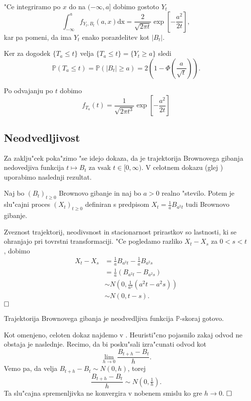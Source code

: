 \documentclass[twoside,11pt]{article}
\begin{document}
"Ce integriramo  po $x$ do na $(-\infty, a]$ dobimo gostoto $Y_t$ 
$$
    \int_{-\infty}^a f_{Y_t, B_t}(a, x)\text{dx} = \frac{2}{\sqrt{2\pi t}}\exp\left[-\frac{a^2}{2t}\right],
$$
kar pa pomeni, da ima $Y_t$ enako porazdelitev kot $|B_t|$.

Ker za dogodek  $\{T_a \leq t\}$ velja $\{T_a \leq t\} = \{Y_t \geq a\}$ sledi 
$$
    \mathbb{P}(T_a \leq t) = \mathbb{P}(|B_t| \geq a) = 2\left(1 - \varPhi\left(\frac{a}{\sqrt{t}}\right)\right).
$$

Po odvajanju po $t$ dobimo
$$
    f_{T_a}(t) = \frac{1}{\sqrt{2\pi t^3}}\exp\left[-\frac{a^2}{2t}\right]
$$

\subsection{Neodvedljivost}
Za zaklju"cek poka"zimo "se idejo dokaza, da je trajektorija Brownovega gibanja nedovedjiva funkcija $t \mapsto B_t$ za vsak $t \in [0, \infty)$. V celotnem dokazu (glej \cite{1}) uporabimo naslednji rezultat.

\begin{lema}
    Naj bo $(B_t)_{t\geq 0}$ Brownovo gibanje in naj bo $a>0$ realno "stevilo. Potem je slu"cajni proces $(X_t)_{t\geq0}$ definiran s predpisom $X_t = \tfrac{1}{a}B_{a^2t}$ tudi Brownovo gibanje.
\end{lema}

\begin{dokaz}
    Zveznost trajektorij, neodivsnost in stacionarnost prirastkov so lastnosti, ki se ohranjajo pri tovrstni transformaciji. "Ce pogledamo razliko $X_t - X_s$ 
    za $0 < s < t$, dobimo
    \begin{align*}
        X_t - X_s &= \tfrac{1}{a}B_{a^2t} - \tfrac{1}{a}B_{a^2s} \\
        &= \tfrac{1}{a}\left(B_{a^2t} - B_{a^2s}\right) \\
       &\sim N\left(0, \tfrac{1}{a^2}(a^2t - a^2s)\right) \\
       &\sim N(0, t-s).
    \end{align*}
    $\hfill \square$
\end{dokaz}

\begin{izrek}
    Trajektorija Brownovega gibanja je neodvedljiva funkcija $\mathbb{P}$-skoraj gotovo.
\end{izrek}

\begin{dokaz}
    Kot omenjeno, celoten dokaz najdemo v \cite{1}. Heuristi"cno pojasnilo zakaj odvod ne obstaja je naslednje. Recimo, da bi posku"sali izra"cunati odvod kot
    $$
        \lim_{h\to0}\frac{B_{t+h} - B_t}{h}.
    $$
    Vemo pa, da velja $B_{t+h} - B_t \sim N(0, h)$, torej
    $$
        \frac{B_{t+h} - B_t}{h} \sim N(0, \tfrac{1}{h}).
    $$
    Ta slu"cajna spremenljivka ne konvergira v nobenem smislu ko gre $h \rightarrow 0$. 
    $\hfill \square$
\end{dokaz}
\end{document}
